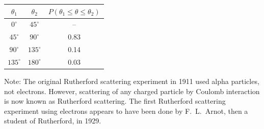 \documentclass[12pt]{article}
\begin{document}
\begin{center}
\begin{tabular}{|c|c|c|}
\hline
$\theta_1$ & $\theta_2$ & $P(\theta_1\le\theta\le\theta_2)$\\
\hline
$0^\circ$ & $45^\circ$ & -- \\
$45^\circ$ & $90^\circ$ & 0.83 \\
$90^\circ$ & $135^\circ$ & 0.14 \\
$135^\circ$ & $180^\circ$ & 0.03 \\
\hline
\end{tabular}
\end{center}

\bigskip
\noindent
Note:
The original Rutherford scattering experiment in 1911 used alpha particles, not electrons.
However, scattering of any charged particle by Coulomb interaction
is now known as Rutherford scattering.
The first Rutherford scattering experiment using electrons appears to have
been done by F.~L.~Arnot, then a student of Rutherford, in 1929.
\end{document}
